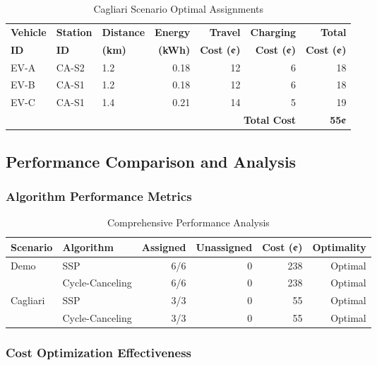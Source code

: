 \documentclass[12pt,a4paper]{article}
\begin{document}
\begin{table}[H]
\centering
\caption{Cagliari Scenario Optimal Assignments}
\label{tab:cagliari_assignments}
\begin{tabular}{@{}lllrrrr@{}}
\toprule
\textbf{Vehicle} & \textbf{Station} & \textbf{Distance} & \textbf{Energy} & \textbf{Travel} & \textbf{Charging} & \textbf{Total} \\
\textbf{ID} & \textbf{ID} & \textbf{(km)} & \textbf{(kWh)} & \textbf{Cost (¢)} & \textbf{Cost (¢)} & \textbf{Cost (¢)} \\
\midrule
EV-A & CA-S2 & 1.2 & 0.18 & 12 & 6 & 18 \\
EV-B & CA-S1 & 1.2 & 0.18 & 12 & 6 & 18 \\
EV-C & CA-S1 & 1.4 & 0.21 & 14 & 5 & 19 \\
\midrule
\multicolumn{6}{r}{\textbf{Total Cost}} & \textbf{55¢} \\
\bottomrule
\end{tabular}
\end{table}

\subsection{Performance Comparison and Analysis}

\subsubsection{Algorithm Performance Metrics}

\begin{table}[H]
\centering
\caption{Comprehensive Performance Analysis}
\label{tab:performance_comparison}
\begin{tabular}{@{}llrrrr@{}}
\toprule
\textbf{Scenario} & \textbf{Algorithm} & \textbf{Assigned} & \textbf{Unassigned} & \textbf{Cost (¢)} & \textbf{Optimality} \\
\midrule
\multirow{2}{*}{Demo} & SSP & 6/6 & 0 & 238 & Optimal \\
                      & Cycle-Canceling & 6/6 & 0 & 238 & Optimal \\
\midrule
\multirow{2}{*}{Cagliari} & SSP & 3/3 & 0 & 55 & Optimal \\
                          & Cycle-Canceling & 3/3 & 0 & 55 & Optimal \\
\bottomrule
\end{tabular}
\end{table}

\subsubsection{Cost Optimization Effectiveness}
\end{document}
